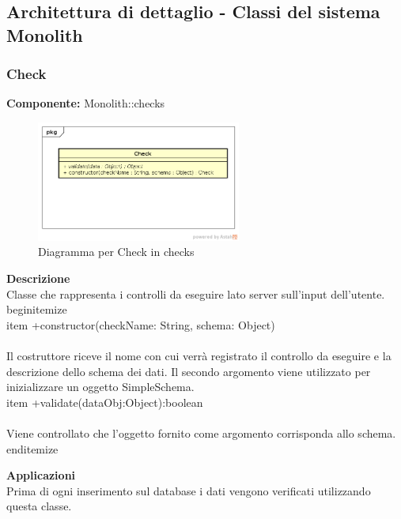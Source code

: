 \clearpage

\subsection{Architettura di dettaglio - Classi del sistema Monolith}\subsubsection{Check}
\textbf{Componente:}  Monolith::checks\\
   \FloatBarrier
   \begin{figure}[ht]
   \centering
   \includegraphics[width=0.6\textwidth]{img/single-Check}
   \caption{{Diagramma per Check in checks}}
\end{figure}
\FloatBarrier
\textbf{Descrizione}\\
Classe che rappresenta i controlli da eseguire lato server sull'input dell'utente. 
\\begin{itemize}
\\item +constructor(checkName: String, schema: Object) \\\\
Il costruttore riceve il nome con cui verrà registrato il controllo da eseguire e la descrizione dello schema dei dati. Il secondo argomento viene utilizzato per inizializzare un oggetto SimpleSchema.
\\item +validate(dataObj:Object):boolean \\\\
Viene controllato che l'oggetto fornito come argomento corrisponda allo schema.
\\end{itemize} 


\textbf{Applicazioni}\\
Prima di ogni inserimento sul database i dati vengono verificati utilizzando questa classe. 


\clearpage

